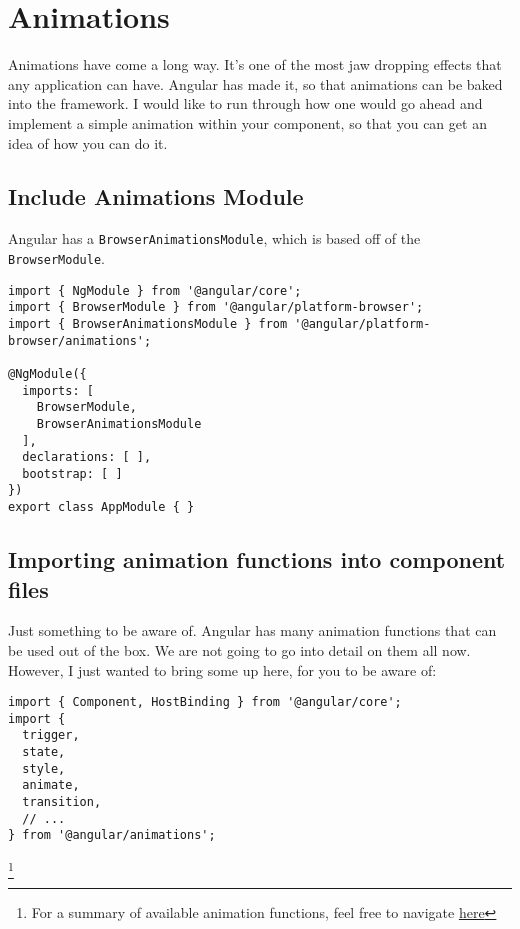 \maketitle{}
\section{ Animations }

Animations have come a long way. It's one of the most jaw dropping effects
that any application can have. Angular has made it, so that animations can be
baked into the framework. I would like to run through how one would go ahead
and implement a simple animation within your component, so that you can get an 
idea of how you can do it. 

\subsection{ Include Animations Module }
Angular has a \lstinline{BrowserAnimationsModule}, which is based off of the 
\lstinline{BrowserModule}.

\begin{lstlisting}[caption=app.module.ts]
import { NgModule } from '@angular/core';
import { BrowserModule } from '@angular/platform-browser';
import { BrowserAnimationsModule } from '@angular/platform-browser/animations';

@NgModule({
  imports: [
    BrowserModule,
    BrowserAnimationsModule
  ],
  declarations: [ ],
  bootstrap: [ ]
})
export class AppModule { }  
\end{lstlisting}

\subsection{ Importing animation functions into component files }
Just something to be aware of. Angular has many animation functions that can
be used out of the box. We are not going to go into detail on them all now. 
However, I just wanted to bring some up here, for you to be aware of: 
\begin{lstlisting}
import { Component, HostBinding } from '@angular/core';
import {
  trigger,
  state,
  style,
  animate,
  transition,
  // ...
} from '@angular/animations';  
\end{lstlisting}

\footnote{For a summary of available animation functions, feel free to navigate 
\href{https://angular.io/guide/animations#animation-api-summary}{here}}

